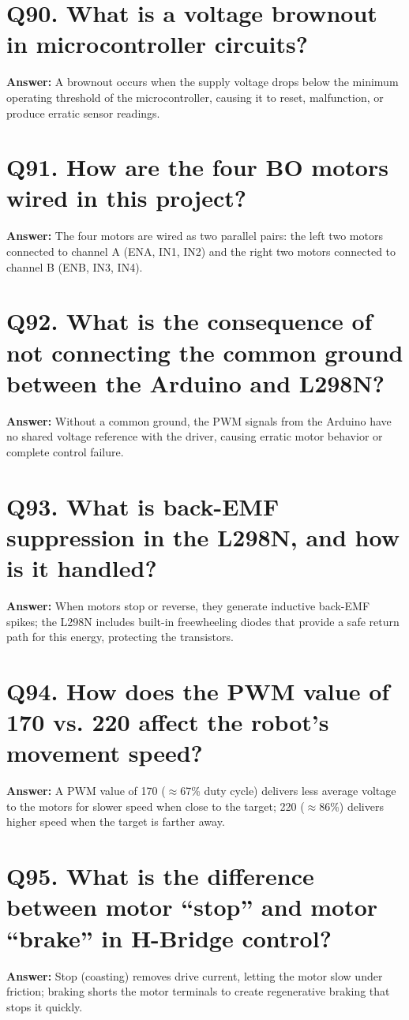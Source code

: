 \documentclass[12pt,a4paper,oneside]{report}
\begin{document}
\section{Q90. What is a voltage brownout in microcontroller circuits?}
\textbf{Answer:} A brownout occurs when the supply voltage drops below the minimum operating threshold of the microcontroller, causing it to reset, malfunction, or produce erratic sensor readings.

\section{Q91. How are the four BO motors wired in this project?}
\textbf{Answer:} The four motors are wired as two parallel pairs: the left two motors connected to channel A (ENA, IN1, IN2) and the right two motors connected to channel B (ENB, IN3, IN4).

\section{Q92. What is the consequence of not connecting the common ground between the Arduino and L298N?}
\textbf{Answer:} Without a common ground, the PWM signals from the Arduino have no shared voltage reference with the driver, causing erratic motor behavior or complete control failure.

\section{Q93. What is back-EMF suppression in the L298N, and how is it handled?}
\textbf{Answer:} When motors stop or reverse, they generate inductive back-EMF spikes; the L298N includes built-in freewheeling diodes that provide a safe return path for this energy, protecting the transistors.

\section{Q94. How does the PWM value of 170 vs. 220 affect the robot's movement speed?}
\textbf{Answer:} A PWM value of 170 ($\approx$67\% duty cycle) delivers less average voltage to the motors for slower speed when close to the target; 220 ($\approx$86\%) delivers higher speed when the target is farther away.

\section{Q95. What is the difference between motor ``stop'' and motor ``brake'' in H-Bridge control?}
\textbf{Answer:} Stop (coasting) removes drive current, letting the motor slow under friction; braking shorts the motor terminals to create regenerative braking that stops it quickly.
\end{document}
